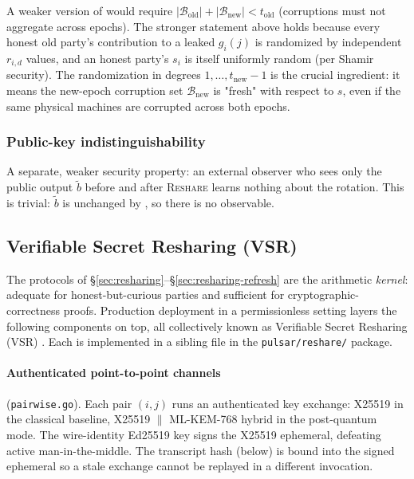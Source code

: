\begin{remark}
A weaker version of  would require $|\mathcal{B}_{\mathrm{old}}| + |\mathcal{B}_{\mathrm{new}}| < t_{\mathrm{old}}$ (corruptions must not aggregate across epochs). The stronger statement above holds because every honest old party's contribution to a leaked $g_i(j)$ is randomized by independent $r_{i,d}$ values, and an honest party's $s_i$ is itself uniformly random (per Shamir security). The randomization in degrees $1, \dots, t_{\mathrm{new}} - 1$ is the crucial ingredient: it means the new-epoch corruption set $\mathcal{B}_{\mathrm{new}}$ is "fresh" with respect to $s$, even if the same physical machines are corrupted across both epochs.
\end{remark}

\subsubsection{Public-key indistinguishability}

A separate, weaker security property: an external observer who sees only the public output $\tilde b$ before and after \textsc{Reshare} learns nothing about the rotation. This is trivial: $\tilde b$ is unchanged by , so there is no observable.

\subsection{Verifiable Secret Resharing (VSR)}
\label{sec:resharing-vsr}

The protocols of \S\ref{sec:resharing}--\S\ref{sec:resharing-refresh} are the arithmetic \emph{kernel}: adequate for honest-but-curious parties and sufficient for cryptographic-correctness proofs. Production deployment in a permissionless setting layers the following components on top, all collectively known as Verifiable Secret Resharing (VSR) \cite{wong02}. Each is implemented in a sibling file in the \texttt{pulsar/reshare/} package.

\paragraph{Authenticated point-to-point channels} (\texttt{pairwise.go}). Each pair $(i, j)$ runs an authenticated key exchange: X25519 in the classical baseline, X25519 $\|$ ML-KEM-768 hybrid in the post-quantum mode. The wire-identity Ed25519 key signs the X25519 ephemeral, defeating active man-in-the-middle. The transcript hash (below) is bound into the signed ephemeral so a stale exchange cannot be replayed in a different invocation.

